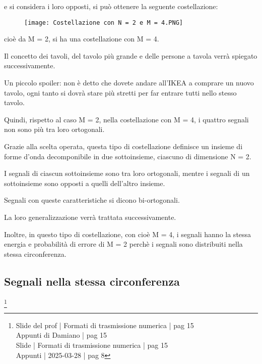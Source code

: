 e si considera i loro opposti, si può ottenere la seguente costellazione: 

\begin{figure}[h]
    \centering
    \texttt{[image: Costellazione con N = 2 e M = 4.PNG]}
\end{figure}

cioè da M = 2, si ha una costellazione con M = 4. \newline 

\begin{tcolorbox}
Il concetto dei tavoli, del tavolo più grande e delle persone a tavola verrà spiegato successivamente. \newline

Un piccolo spoiler: non è detto che dovete andare all'IKEA a comprare un nuovo tavolo, ogni tanto si dovrà stare più stretti per far entrare tutti nello stesso tavolo.
\end{tcolorbox}

Quindi, rispetto al caso M = 2, nella costellazione con M = 4, i quattro segnali non sono più tra loro ortogonali. \newline 

Grazie alla scelta operata, questa tipo di costellazione definisce un insieme di forme d'onda decomponibile in due sottoinsieme, 
ciascuno di dimensione N = 2. \newline 

I segnali di ciascun sottoinsieme sono tra loro ortogonali, 
mentre i segnali di un sottoinsieme sono opposti a quelli dell'altro insieme. \newline 

Segnali con queste caratteristiche si dicono bi-ortogonali. \newline 

La loro generalizzazione verrà trattata successivamente. \newline 

Inoltre, in questo tipo di costellazione, con cioè M = 4, i segnali hanno la stessa energia e probabilità di errore di M = 2 perchè i segnali sono distribuiti nella stessa circonferenza. \newline

\newpage 

\subsection{Segnali nella stessa circonferenza}
\footnote{Slide del prof | Formati di trasmissione numerica | pag 15 \\  
Appunti di Damiano | pag 15 \\
Slide | Formati di trasmissione numerica | pag  15\\
Appunti | 2025-03-28 | pag 8
}

